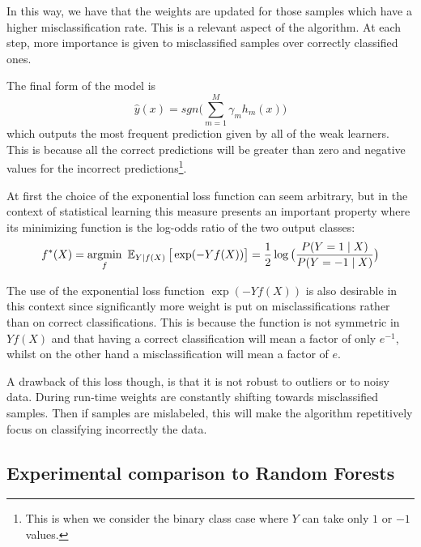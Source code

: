 In this way, we have that the weights are updated for those samples which have a higher misclassification rate.
This is a relevant aspect of the algorithm.
At each step, more importance is given to misclassified samples over correctly classified ones.



The final form of the model is
\begin{equation}
 \hat{y}(x) = sgn\big( \sum_{m=1}^{M} \gamma_m h_m(x) \big)
\end{equation}
  which outputs the most frequent prediction given by all of the weak learners.
  This is because all the correct predictions will be greater than zero and negative values for the incorrect predictions\footnote{This is when we consider the binary class case where $Y$ can take only $1$ or $-1$ values.}.

At first the choice of the exponential loss function can seem arbitrary, but in the context of statistical learning this measure presents an important property where its minimizing function is the log-odds ratio of the two output classes:
\begin{equation}
f^*(X) = \underset{f}{\mathrm{argmin}} \ \Expect_{Y | f(X)}\big[ \exp(-Yf(X)) \big] = \frac{1}{2}\log\big( \frac{ P(Y=1 \mid X) }{ P(Y=-1 \mid X) } \big)
\end{equation}


The use of the exponential loss function $\exp(-Yf(X))$ is also desirable in this context since significantly more weight is put on misclassifications rather than on correct classifications.
This is because the function is not symmetric in $Yf(X)$ and that having a correct classification will mean a factor of only $e^{-1}$, whilst on the other hand a misclassification will mean a factor of $e$.

A drawback of this loss though, is that it is not robust to outliers or to noisy data.
During run-time weights are constantly shifting towards misclassified samples.
Then if samples are mislabeled, this will make the algorithm repetitively focus on classifying incorrectly the data.


\subsection{ Experimental comparison to Random Forests}\label{subsection:boosting_comparison_forest}

